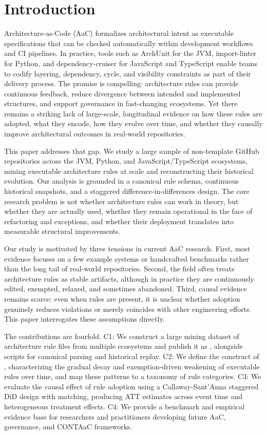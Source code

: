 \section{Introduction}\label{sec:introduction}

Architecture-as-Code (AaC) formalizes architectural
intent as executable specifications that can 
be checked automatically within development 
workflows and CI pipelines. In practice, tools 
such as ArchUnit for the JVM, import-linter for 
Python, and dependency-cruiser for JavaScript and 
TypeScript enable teams to codify layering, 
dependency, cycle, and visibility constraints 
as part of their delivery process. The promise is 
compelling: architecture rules can provide 
continuous feedback, reduce divergence between 
intended and implemented structures, and support 
governance in fast-changing ecosystems. Yet there 
remains a striking lack of large-scale, longitudinal 
evidence on how these rules are adopted, what they 
encode, how they evolve over time, and whether they 
causally improve architectural outcomes in real-world 
repositories.

This paper addresses that gap. We study a large sample of non-template GitHub repositories across the JVM, Python, and JavaScript/TypeScript ecosystems, mining executable architecture rules at scale and reconstructing their historical evolution. Our analysis is grounded in a canonical rule schema, continuous historical snapshots, and a staggered difference-in-differences design. The core research problem is not whether architecture rules can work in theory, but whether they are actually used, whether they remain operational in the face of refactoring and exceptions, and whether their deployment translates into measurable structural improvements.

Our study is motivated by three tensions in current AaC research. First, most evidence focuses on a few example systems or handcrafted benchmarks rather than the long tail of real-world repositories. Second, the field often treats architecture rules as stable artifacts, although in practice they are continuously edited, exempted, relaxed, and sometimes abandoned. Third, causal evidence remains scarce: even when rules are present, it is unclear whether adoption genuinely reduces violations or merely coincides with other engineering efforts. This paper interrogates these assumptions directly.

The contributions are fourfold. C1: We construct a large mining dataset of architecture rule files from multiple ecosystems and publish it as \ArchRules, alongside scripts for canonical parsing and historical replay. C2: We define the construct of \rrot, characterizing the gradual decay and exemption-driven weakening of executable rules over time, and map these patterns to a taxonomy of rule categories. C3: We evaluate the causal effect of rule adoption using a Callaway-Sant'Anna staggered DiD design with matching, producing ATT estimates across event time and heterogeneous treatment effects. C4: We provide a benchmark and empirical evidence base for researchers and practitioners developing future AaC, governance, and CONTAaC frameworks.

